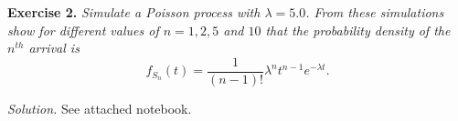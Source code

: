 
\textbf{Exercise 2. }\emph{Simulate a Poisson process with \( \lambda = 5.0 \). From these simulations show for different values of \( n = 1,2,5 \) and \( 10 \) that the probability density of the \( n^{th} \) arrival is  }
\begin{equation}
  \label{eq:erlang}
  f_{S_{n}}(t) = \frac{1}{(n-1)!} \lambda^{n}t^{n-1}e^{-\lambda t}.
\end{equation}

\textit{Solution.} See attached notebook.\\
